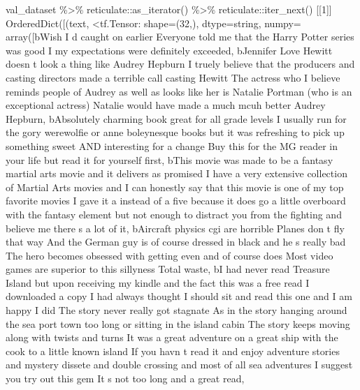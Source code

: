 \documentclass[
]{article}
\newenvironment{Shaded}{}{}
\newcommand{\AttributeTok}[1]{\textcolor[rgb]{0.49,0.56,0.16}{#1}}
\newcommand{\DecValTok}[1]{\textcolor[rgb]{0.25,0.63,0.44}{#1}}
\newcommand{\FunctionTok}[1]{\textcolor[rgb]{0.02,0.16,0.49}{#1}}
\newcommand{\NormalTok}[1]{#1}
\newcommand{\SpecialCharTok}[1]{\textcolor[rgb]{0.25,0.44,0.63}{#1}}
\newcommand{\StringTok}[1]{\textcolor[rgb]{0.25,0.44,0.63}{#1}}
\begin{document}
\begin{Shaded}
\begin{Highlighting}[]
\NormalTok{val\_dataset }\SpecialCharTok{\%\textgreater{}\%}
\NormalTok{    reticulate}\SpecialCharTok{::}\FunctionTok{as\_iterator}\NormalTok{() }\SpecialCharTok{\%\textgreater{}\%}
\NormalTok{    reticulate}\SpecialCharTok{::}\FunctionTok{iter\_next}\NormalTok{()}
\NormalTok{[[}\DecValTok{1}\NormalTok{]]}
\FunctionTok{OrderedDict}\NormalTok{([(}\StringTok{\textquotesingle{}text\textquotesingle{}}\NormalTok{, }\SpecialCharTok{\textless{}}\NormalTok{tf.Tensor}\SpecialCharTok{:} \AttributeTok{shape=}\NormalTok{(}\DecValTok{32}\NormalTok{,), }\AttributeTok{dtype=}\NormalTok{string, }\AttributeTok{numpy=}
\FunctionTok{array}\NormalTok{([b}\StringTok{\textquotesingle{}Wish I d caught on earlier Everyone told me that the Harry Potter series was good I my expectations were definitely exceeded\textquotesingle{}}\NormalTok{,}
\NormalTok{       b}\StringTok{\textquotesingle{}Jennifer Love Hewitt doesn t look a thing like Audrey Hepburn I truely believe that the producers and casting directors made a terrible call casting Hewitt The actress who I believe reminds people of Audrey as well as looks like her is Natalie Portman (who is an exceptional actress) Natalie would have made a much mcuh better Audrey Hepburn\textquotesingle{}}\NormalTok{,}
\NormalTok{       b}\StringTok{\textquotesingle{}Absolutely charming book great for all grade levels I usually run for the gory werewolfie or anne boleynesque books but it was refreshing to pick up something sweet AND interesting for a change Buy this for the MG reader in your life but read it for yourself first\textquotesingle{}}\NormalTok{,}
\NormalTok{       b}\StringTok{\textquotesingle{}This movie was made to be a fantasy martial arts movie and it delivers as promised I have a very extensive collection of Martial Arts movies and I can honestly say that this movie is one of my top favorite movies I gave it a instead of a five because it does go a little overboard with the fantasy element but not enough to distract you from the fighting and believe me there s a lot of it\textquotesingle{}}\NormalTok{,}
\NormalTok{       b}\StringTok{\textquotesingle{}Aircraft physics cgi are horrible Planes don t fly that way And the German guy is of course dressed in black and he s really bad The hero becomes obsessed with getting even and of course does Most video games are superior to this sillyness Total waste\textquotesingle{}}\NormalTok{,}
\NormalTok{       b}\StringTok{\textquotesingle{}I had never read Treasure Island but upon receiving my kindle and the fact this was a free read I downloaded a copy I had always thought I should sit and read this one and I am happy I did The story never really got stagnate As in the story hanging around the sea port town too long or sitting in the island cabin The story keeps moving along with twists and turns It was a great adventure on a great ship with the cook to a little known island If you havn t read it and enjoy adventure stories and mystery dissete and double crossing and most of all sea adventures I suggest you try out this gem It s not too long and a great read\textquotesingle{}}\NormalTok{,}

\end{Highlighting}
\end{Shaded}
\end{document}
